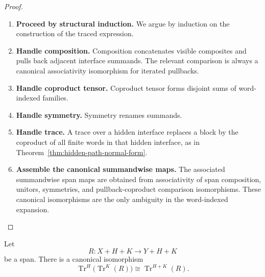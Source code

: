 \begin{proof}
\begin{enumerate}
  \item \textbf{Proceed by structural induction.}
  We argue by induction on the construction of the traced expression.

  \item \textbf{Handle composition.}
  Composition concatenates visible composites and pulls back adjacent
  interface summands. The relevant comparison is always a canonical
  associativity isomorphism for iterated pullbacks.

  \item \textbf{Handle coproduct tensor.}
  Coproduct tensor forms disjoint sums of word-indexed families.

  \item \textbf{Handle symmetry.}
  Symmetry renames summands.

  \item \textbf{Handle trace.}
  A trace over a hidden interface replaces a block by the coproduct of all
  finite words in that hidden interface, as in
  Theorem~\ref{thm:hidden-path-normal-form}.

  \item \textbf{Assemble the canonical summandwise maps.}
  The associated summandwise span maps are obtained from associativity of span
  composition, unitors, symmetries, and pullback-coproduct comparison
  isomorphisms. These canonical isomorphisms are the only ambiguity in the
  word-indexed expansion.
\end{enumerate}
\end{proof}

\begin{lemma}
\label{lem:hidden-path-substitution}
Let
\[
  R:X+H+K\to Y+H+K
\]
be a span. There is a canonical isomorphism
\[
  \operatorname{Tr}^{H}
  \bigl(
    \operatorname{Tr}^{K}(R)
  \bigr)
  \cong
  \operatorname{Tr}^{H+K}(R).
\]
\end{lemma}

